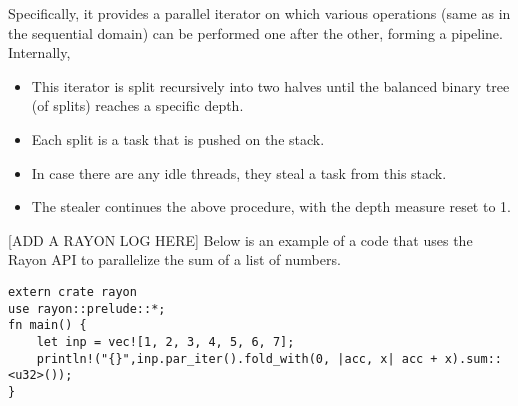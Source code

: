 Specifically, it provides a parallel iterator on which various operations (same as in the sequential domain) can be performed one after the other, forming a pipeline. Internally,
\begin{itemize}
    \item This iterator is split recursively into two halves until the balanced binary tree (of splits) reaches a specific depth.
    \item Each split is a task that is pushed on the stack.
    \item In case there are any idle threads, they steal a task from this stack.
    \item The stealer continues the above procedure, with the depth measure reset to 1.
\end{itemize}
[ADD A RAYON LOG HERE]
Below is an example of a code that uses the Rayon API to parallelize the sum of a list of numbers.
\begin{verbatim}
extern crate rayon
use rayon::prelude::*;
fn main() {
    let inp = vec![1, 2, 3, 4, 5, 6, 7];
    println!("{}",inp.par_iter().fold_with(0, |acc, x| acc + x).sum::<u32>());
}
\end{verbatim}
%
%
%
